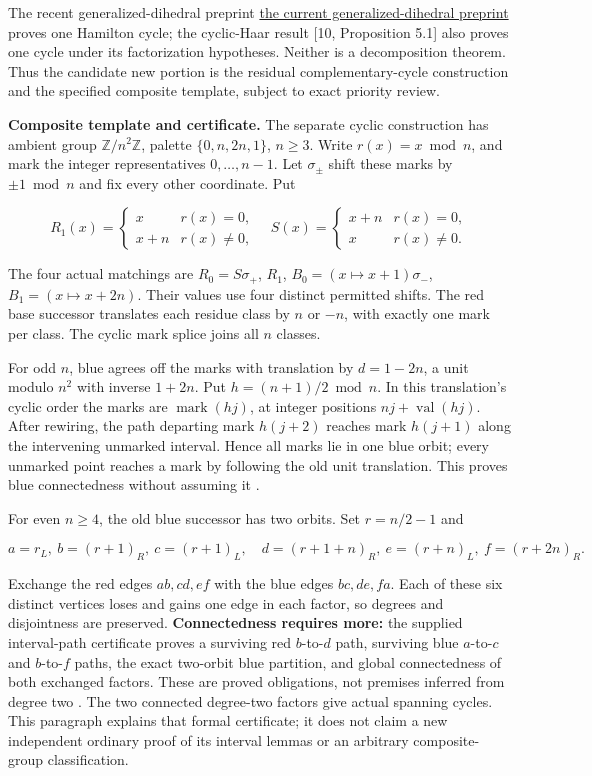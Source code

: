 \documentclass[smallextended]{svjour3}
\begin{document}
The recent generalized-dihedral preprint
\href{https://arxiv.org/html/1810.13311v3}{the current
generalized-dihedral preprint} proves one Hamilton cycle; the
cyclic-Haar result {[}10, Proposition 5.1{]} also proves one cycle under
its factorization hypotheses. Neither is a decomposition theorem. Thus
the candidate new portion is the residual complementary-cycle
construction and the specified composite template, subject to exact
priority review.

\textbf{Composite template and certificate.} The separate cyclic
construction has ambient group \(\mathbb Z/n^2\mathbb Z\), palette
\(\{0,n,2n,1\}\), \(n\ge3\). Write \(r(x)=x\bmod n\), and mark the
integer representatives \(0,\ldots,n-1\). Let \(\sigma_\pm\) shift these
marks by \(\pm1\bmod n\) and fix every other coordinate. Put

\[
R_1(x)=\begin{cases}x&r(x)=0,\\x+n&r(x)\ne0,\end{cases}
\quad
S(x)=\begin{cases}x+n&r(x)=0,\\x&r(x)\ne0.\end{cases}
\]

The four actual matchings are \(R_0=S\sigma_+\), \(R_1\),
\(B_0=(x\mapsto x+1)\sigma_-\), \(B_1=(x\mapsto x+2n)\). Their values
use four distinct permitted shifts. The red base successor translates
each residue class by \(n\) or \(-n\), with exactly one mark per class.
The cyclic mark splice joins all \(n\) classes.

For odd \(n\), blue agrees off the marks with translation by \(d=1-2n\),
a unit modulo \(n^2\) with inverse \(1+2n\). Put \(h=(n+1)/2\bmod n\).
In this translation's cyclic order the marks are
\(\operatorname{mark}(hj)\), at integer positions
\(nj+\operatorname{val}(hj)\). After rewiring, the path departing mark
\(h(j+2)\) reaches mark \(h(j+1)\) along the intervening unmarked
interval. Hence all marks lie in one blue orbit; every unmarked point
reaches a mark by following the old unit translation. This proves blue
connectedness without assuming it \cite{ref11}.

For even \(n\ge4\), the old blue successor has two orbits. Set
\(r=n/2-1\) and

\[
a=r_L,\ b=(r+1)_R,\ c=(r+1)_L,\quad
d=(r+1+n)_R,\ e=(r+n)_L,\ f=(r+2n)_R.
\]

Exchange the red edges \(ab,cd,ef\) with the blue edges \(bc,de,fa\).
Each of these six distinct vertices loses and gains one edge in each
factor, so degrees and disjointness are preserved. \textbf{Connectedness
requires more:} the supplied interval-path certificate proves a
surviving red \(b\)-to-\(d\) path, surviving blue \(a\)-to-\(c\) and
\(b\)-to-\(f\) paths, the exact two-orbit blue partition, and global
connectedness of both exchanged factors. These are proved obligations,
not premises inferred from degree two \cite{ref11}. The two connected
degree-two factors give actual spanning cycles. This paragraph explains
that formal certificate; it does not claim a new independent ordinary
proof of its interval lemmas or an arbitrary composite-group
classification.
\end{document}
